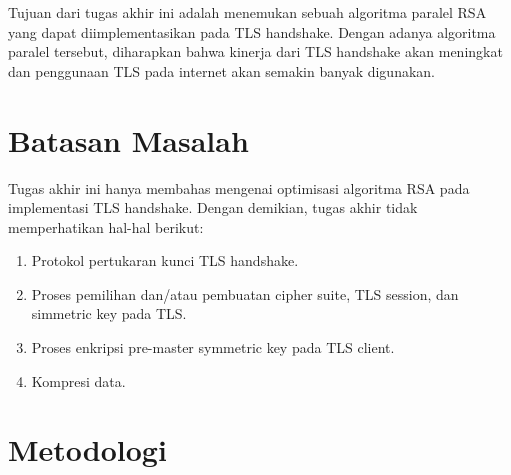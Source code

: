 Tujuan dari tugas akhir ini adalah menemukan sebuah algoritma paralel RSA yang dapat diimplementasikan pada TLS handshake. Dengan adanya algoritma paralel tersebut, diharapkan bahwa kinerja dari TLS handshake akan meningkat dan penggunaan TLS pada internet akan semakin banyak digunakan.

\section{Batasan Masalah}

Tugas akhir ini hanya membahas mengenai optimisasi algoritma RSA pada implementasi TLS handshake. Dengan demikian, tugas akhir tidak memperhatikan hal-hal berikut:

\begin{enumerate}
  \item Protokol pertukaran kunci TLS handshake.
  \item Proses pemilihan dan/atau pembuatan cipher suite, TLS session, dan simmetric key pada TLS.
  \item Proses enkripsi pre-master symmetric key pada TLS client.
  \item Kompresi data.
\end{enumerate}

\section{Metodologi}

